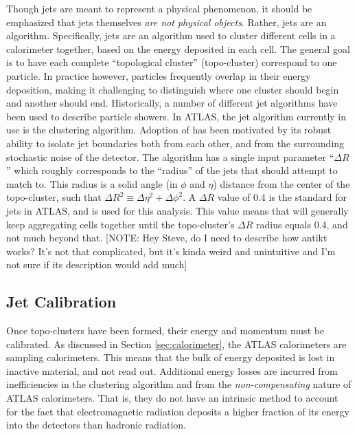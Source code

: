 
        Though jets are meant to represent a physical phenomenon,
            it should be emphasized that jets themselves \textit{are not physical objects}.
        Rather, jets are an algorithm.
        Specifically, jets are an algorithm used to cluster different cells in a calorimeter together,
            based on the energy deposited in each cell.
        The general goal is to have each complete ``topological cluster'' (topo-cluster) correspond to one particle.
        In practice however, particles frequently overlap in their energy deposition,
            making it challenging to distinguish where one cluster should begin and another should end.
        Historically, a number of different jet algorithms have been used to describe particle showers.
        In ATLAS, the jet algorithm currently in use is the \textit{\antikt} clustering algorithm\cite{anti_kt}.
        Adoption of \antikt has been motivated by its robust ability to isolate jet boundaries both from each other,
            and from the surrounding stochastic noise of the detector.
        The \antikt algorithm has a single input parameter ``$\Delta R$'' which roughly corresponds to the ``radius''
            of the jets that \antikt should attempt to match to.
        This radius is a solid angle (in $\phi$ and $\eta$) distance from the center of the topo-cluster,
            such that $\Delta R^2 \equiv \Delta \eta^2 + \Delta \phi^2$.
        A $\Delta R$ value of 0.4 is the standard for jets in ATLAS, and is used for this analysis.
        This value means that \antikt will generally keep aggregating cells together until the topo-cluster's
            $\Delta R$ radius equals 0.4, and not much beyond that.
        [NOTE: Hey Steve, do I need to describe how antikt works?
        It's not that complicated, but it's kinda weird and unintuitive and I'm not sure if its description would add much]

        \subsection{Jet Calibration}

        Once topo-clusters have been formed, their energy and momentum must be calibrated.
        As discussed in Section \ref{sec:calorimeter}, the ATLAS calorimeters are sampling calorimeters.
        This means that the bulk of energy deposited is lost in inactive material, and not read out.
        Additional energy losses are incurred from inefficiencies in the clustering algorithm and from the \textit{non-compensating} nature of ATLAS calorimeters.
        That is, they do not have an intrinsic method to account for the fact that electromagnetic radiation deposits a higher fraction of its energy into the detectors than hadronic radiation\cite{cell_clustering}.


